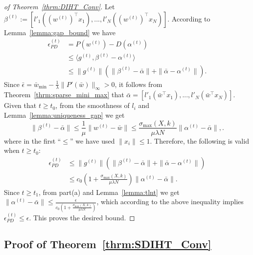 \documentclass[11pt]{article}
\numberwithin{equation}{section}
\numberwithin{table}{section}
\numberwithin{figure}{section}
\begin{document}
\begin{proof}[of Theorem~\ref{thrm:DIHT_Conv}]
Let $\beta^{(t)}:=[l'_1((w^{(t)})^\top x_1),...,l'_N((w^{(t)})^\top x_N)]$. According to Lemma~\ref{lemma:gap_bound} we have
\[
\begin{aligned}
\epsilon_{PD}^{(t)} &= P(w^{(t)}) - D(\alpha^{(t)}) \\
&\le \langle g^{(t)}, \beta^{(t)} - \alpha^{(t)}\rangle \\
& \le \|g^{(t)}\| (\|\beta^{(t)} -\bar \alpha\| + \|\bar\alpha- \alpha^{(t)}\|).
\end{aligned}
\]
Since $\bar\epsilon = \bar w_{\min} - \frac{1}{\lambda} \|P'(\bar w)\|_\infty >0$, it follows from Theorem~\ref{thrm:sparse_mini_max} that $
\bar\alpha = [l'_1(\bar w^\top x_1),..., l'_N(\bar w^\top x_N)]$. Given that $t \ge t_0$,  from the smoothness of $l_i$ and Lemma~\ref{lemma:uniqueness_gap} we get
\[
\|\beta^{(t)} - \bar\alpha\|\le \frac{1}{\mu} \|w^{(t)} - \bar w\| \le \frac{\sigma_{\max}(X,k)}{\mu\lambda N} \|\alpha^{(t)}-\bar\alpha\|,.
\]
where in the first ``$\le$'' we have used $\|x_i\|\le 1$. Therefore, the following is valid when $t \ge t_0$:
\[
\begin{aligned}
\epsilon_{PD}^{(t)} &\le  \|g^{(t)}\| (\|\beta^{(t)} -\bar \alpha\| + \|\bar\alpha- \alpha^{(t)}\|) \\
&\le c_0\left( 1 + \frac{\sigma_{\max}(X,k)}{\mu\lambda N} \right) \|\alpha^{(t)} - \bar\alpha\|.
\end{aligned}
\]
Since $t \ge t_1$, from part(a) and Lemma~\ref{lemma:tlnt} we get $\|\alpha^{(t)} - \bar \alpha\| \le \frac{\epsilon}{c_0\left( 1 + \frac{\sigma_{\max}(X,k)}{\mu\lambda N} \right)}$, which according to the above inequality implies $\epsilon_{PD}^{(t)} \le \epsilon$. This proves the desired bound.
\end{proof}

\subsection{Proof of Theorem~\ref{thrm:SDIHT_Conv}}
\label{append:proof_SDIHT_conv}
\end{document}

